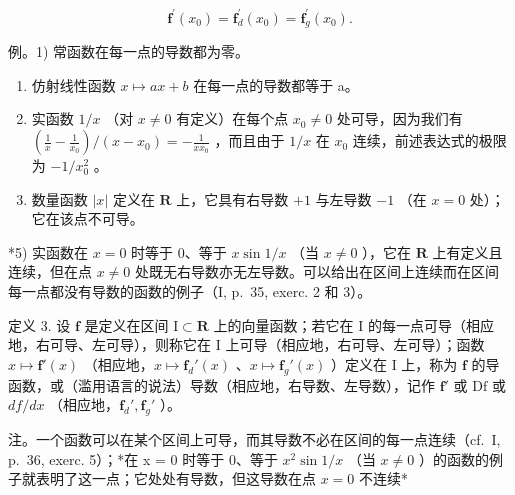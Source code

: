 \[
\mathbf {f} ^ {\prime} (x _ {0}) = \mathbf {f} _ {d} ^ {\prime} (x _ {0}) = \mathbf {f} _ {g} ^ {\prime} (x _ {0}).
\]

例。1) 常函数在每一点的导数都为零。

\begin{enumerate}
\def\labelenumi{\arabic{enumi})}
\setcounter{enumi}{1}
\item
  仿射线性函数 \(x \mapsto ax + b\) 在每一点的导数都等于 a。
\item
  实函数 \(1 / x\) （对 \(x \neq 0\) 有定义）在每个点 \(x_0 \neq 0\) 处可导，因为我们有 \(\left(\frac{1}{x} - \frac{1}{x_0}\right) / (x - x_0) = -\frac{1}{xx_0}\) ，而且由于 \(1 / x\) 在 \(x_0\) 连续，前述表达式的极限为 \(-1 / x_0^2\) 。
\item
  数量函数 \(|x|\) 定义在 \(\mathbf{R}\) 上，它具有右导数 \(+1\) 与左导数 \(-1\) （在 \(x = 0\) 处）；它在该点不可导。
\end{enumerate}

*5) 实函数在 \(x = 0\) 时等于 0、等于 \(x \sin 1/x\) （当 \(x \neq 0\) ），它在 \(\mathbf{R}\) 上有定义且连续，但在点 \(x \neq 0\) 处既无右导数亦无左导数。可以给出在区间上连续而在区间每一点都没有导数的函数的例子（I, p.~35, exerc. 2 和 3）。

定义 3. 设 \(\mathbf{f}\) 是定义在区间 \(\mathrm{I} \subset \mathbf{R}\) 上的向量函数；若它在 \(\mathrm{I}\) 的每一点可导（相应地，右可导、左可导），则称它在 \(\mathrm{I}\) 上可导（相应地，右可导、左可导）；函数 \(x \mapsto \mathbf{f}'(x)\) （相应地，\(x \mapsto \mathbf{f}_d'(x)\) 、\(x \mapsto \mathbf{f}_g'(x)\) ）定义在 \(\mathrm{I}\) 上，称为 \(\mathbf{f}\) 的导函数，或（滥用语言的说法）导数（相应地，右导数、左导数），记作 \(\mathbf{f}'\) 或 \(\mathrm{Df}\) 或 \(df/dx\) （相应地，\(\mathbf{f}_d', \mathbf{f}_g'\) ）。

注。一个函数可以在某个区间上可导，而其导数不必在区间的每一点连续（cf.~I, p.~36, exerc. 5）；*在 x = 0 时等于 0、等于 \(x^{2} \sin 1/x\) （当 \(x \neq 0\) ）的函数的例子就表明了这一点；它处处有导数，但这导数在点 \(x = 0\) 不连续*

